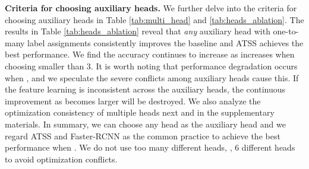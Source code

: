 \vspace{1mm}
\noindent\textbf{Criteria for choosing auxiliary heads.}
We further delve into the criteria for choosing auxiliary heads in Table \ref{tab:multi_head} and \ref{tab:heads_ablation}.
The results in Table \ref{tab:heads_ablation} reveal that \textit{any} auxiliary head with one-to-many label assignments consistently improves the baseline and ATSS achieves the best performance. 
We find the accuracy continues to increase as  increases when choosing  smaller than 3.
It is worth noting that performance degradation occurs when , and we speculate the severe conflicts among auxiliary heads cause this.
If the feature learning is inconsistent across the auxiliary heads, the continuous improvement as  becomes larger will be destroyed.
We also analyze the optimization consistency of multiple heads next and in the supplementary materials.
In summary, we can choose any head as the auxiliary head and we regard ATSS and Faster-RCNN as the common practice to achieve the best performance when .
We do not use too many different heads, \eg, 6 different heads to avoid optimization conflicts.






